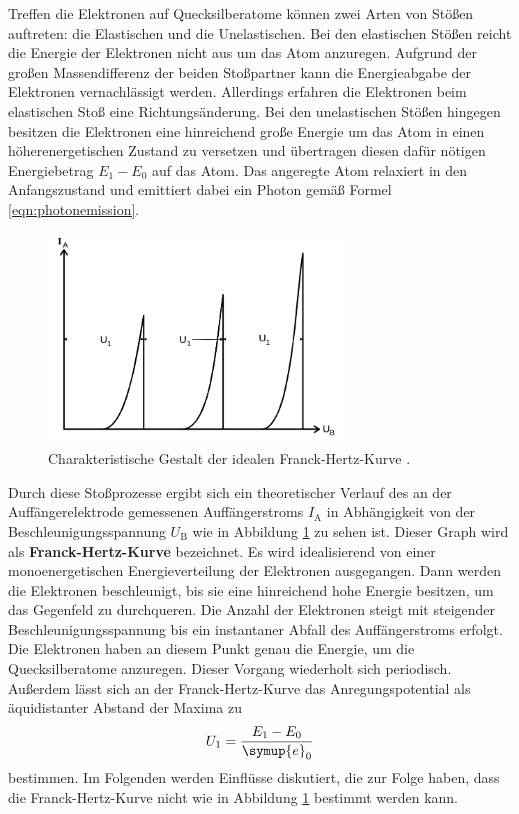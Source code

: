 Treffen die Elektronen auf Quecksilberatome können zwei Arten von Stößen auftreten: die
Elastischen und die Unelastischen. Bei den elastischen Stößen reicht die Energie der Elektronen
nicht aus um das Atom anzuregen. Aufgrund der großen Massendifferenz der beiden Stoßpartner
kann die Energieabgabe der Elektronen vernachlässigt werden. Allerdings erfahren die Elektronen
beim elastischen Stoß eine Richtungsänderung.
Bei den unelastischen Stößen hingegen besitzen die Elektronen eine hinreichend große
Energie um das Atom in einen höherenergetischen Zustand zu versetzen und übertragen diesen
dafür nötigen Energiebetrag $E_1-E_0$ auf das Atom.
Das angeregte Atom relaxiert in den Anfangszustand und emittiert dabei ein Photon gemäß
Formel \eqref{eqn:photonemission}.
\begin{figure}
  \centering
  \includegraphics[width=0.7\textwidth]{Bilder/ideale_hertzkurve.png}
  \caption{Charakteristische Gestalt der idealen Franck-Hertz-Kurve \cite{Anleitung}.}
  \label{fig:franckhertzkurve}
\end{figure}
Durch diese Stoßprozesse ergibt sich ein theoretischer Verlauf des an der Auffängerelektrode
gemessenen Auffängerstroms $I_{\mathrm{A}}$ in Abhängigkeit von der Beschleunigungsspannung
$U_{\mathrm{B}}$ wie in Abbildung \ref{fig:franckhertzkurve} zu sehen ist.
Dieser Graph wird als \textbf{Franck-Hertz-Kurve} bezeichnet.
Es wird idealisierend von einer monoenergetischen Energieverteilung der Elektronen ausgegangen.
Dann werden die Elektronen beschleunigt, bis sie eine hinreichend hohe Energie besitzen, um
das Gegenfeld zu durchqueren. Die Anzahl der Elektronen steigt mit steigender
Beschleunigungsspannung bis ein instantaner Abfall des Auffängerstroms erfolgt. Die Elektronen
haben an diesem Punkt genau die Energie, um die Quecksilberatome anzuregen. Dieser Vorgang
wiederholt sich periodisch.
Außerdem lässt sich an der Franck-Hertz-Kurve das Anregungspotential als äquidistanter
Abstand der Maxima zu
\begin{equation}
	\label{eqn:abstand}
	U_1 = \frac{E_1-E_0}{\symup{e}_0}
\end{equation}
bestimmen.
Im Folgenden werden Einflüsse diskutiert, die zur Folge haben, dass die Franck-Hertz-Kurve nicht
wie in Abbildung \ref{fig:franckhertzkurve} bestimmt werden kann.
